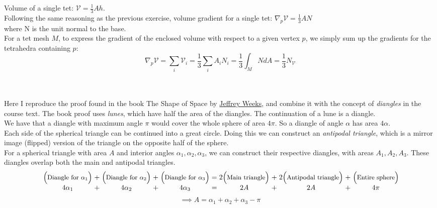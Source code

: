 \documentclass{article}
\newcommand\ifrac[2]{{\displaystyle\frac{#1}{#2}}}
\def\grad{\nabla}
\def\cV{\mathcal{V}}
\begin{document}
Volume of a single tet: $\cV = \ifrac13 A h$.\\
Following the same reasoning as the previous exercise, volume gradient for a single tet: $\grad_p \cV =  \ifrac13 A N$\\
where N is the unit normal to the base.\\
For a tet mesh $M$, to express the gradient of the enclosed volume with respect to a given vertex $p$,
we simply sum up the gradients for the tetrahedra containing $p$:
$$
    \grad_p \cV = \sum_i \cV_i = \frac13 \sum_i A_i N_i = \frac13 \int_M NdA = \frac13 N_{\cV}
$$


\pagebreak
{}\\\\


Here I reproduce the proof found in the book The Shape of Space by \href{https://www.geometrygames.org/}{Jeffrey Weeks}, and combine it with the concept of \emph{diangles} in the course text.
The book proof uses \emph{lunes}, which have half the area of the diangles. The continuation of a lune is a diangle.\\

We have that a diangle with maximum angle $\pi$ would cover the whole sphere of area $4\pi$.
So a diangle of angle $\alpha$ has area $4\alpha$.\\

Each side of the spherical triangle can be continued into a great circle. Doing this we can construct an \emph{antipodal triangle}, which 
is a mirror image (flipped) version of the triangle on the opposite half of the sphere.\\

For a spherical triangle with area $A$ and interior angles $\alpha_1, \alpha_2, \alpha_3$, we can construct their respective diangles,
with areas $A_1, A_2, A_3$. These diangles overlap both the main and antipodal triangles.\\

\begin{equation*}
    \setlength\arraycolsep{1.5pt}
    \begin{array}{rccccccccccc}
        &\Bigl(\text{\small{Diangle for} $\alpha_1$}\Bigr) &+ &\Bigl(\text{\small{Diangle for} $\alpha_2$}\Bigr) &+ &\Bigl(\text{\small{Diangle for} $\alpha_3$}\Bigr)
        &= &2\Bigl(\text{\small{Main triangle}}\Bigr) &+ &2\Bigl(\text{\small{Antipodal triangle}}\Bigr) &+ &\Bigl(\text{\small{Entire sphere}}\Bigr)\\
        &4\alpha_1 &+ &4\alpha_2 &+ &4\alpha_3 &= &2A &+ &2A &+ &4\pi
    \end{array}
\end{equation*}
$$\implies A = \alpha_1 + \alpha_2 + \alpha_3 - \pi$$
\end{document}
